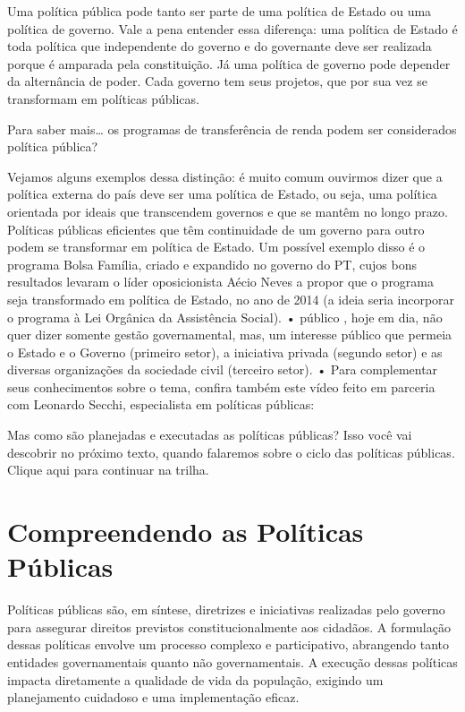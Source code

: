 \documentclass[
   article,       
   12pt,          
   oneside,       
   a4paper,       
   english,       
   brazil,        
   sumario=tradicional
   ]{abntex2}
\begin{document}
Uma política pública pode tanto ser parte de uma política de Estado ou uma política de governo. Vale a pena entender essa diferença: uma política de Estado é toda política que independente do governo e do governante deve ser realizada porque é amparada pela constituição. Já uma política de governo pode depender da alternância de poder. Cada governo tem seus projetos, que por sua vez se transformam em políticas públicas.

Para saber mais… os programas de transferência de renda podem ser considerados política pública?

Vejamos alguns exemplos dessa distinção: é muito comum ouvirmos dizer que a política externa do país deve ser uma política de Estado, ou seja, uma política orientada por ideais que transcendem governos e que se mantêm no longo prazo. Políticas públicas eficientes que têm continuidade de um governo para outro podem se transformar em política de Estado. Um possível exemplo disso é o programa Bolsa Família, criado e expandido no governo do PT, cujos bons resultados levaram o líder oposicionista Aécio Neves a propor que o programa seja transformado em política de Estado, no ano de 2014 (a ideia seria incorporar o programa à Lei Orgânica da Assistência Social).
• público , hoje em dia, não quer dizer somente gestão governamental, mas, um interesse público que permeia o Estado e o Governo (primeiro setor), a iniciativa privada (segundo setor) e as diversas organizações da sociedade civil (terceiro setor).
• Para complementar seus conhecimentos sobre o tema, confira também este vídeo feito em parceria com Leonardo Secchi, especialista em políticas públicas:

Mas como são planejadas e executadas as políticas públicas? Isso você vai descobrir no próximo texto, quando falaremos sobre o ciclo das políticas públicas. Clique aqui para continuar na trilha.

\section{Compreendendo as Políticas Públicas}

Políticas públicas são, em síntese, diretrizes e iniciativas realizadas pelo governo para assegurar direitos previstos constitucionalmente aos cidadãos. A formulação dessas políticas envolve um processo complexo e participativo, abrangendo tanto entidades governamentais quanto não governamentais. A execução dessas políticas impacta diretamente a qualidade de vida da população, exigindo um planejamento cuidadoso e uma implementação eficaz.
\end{document}
